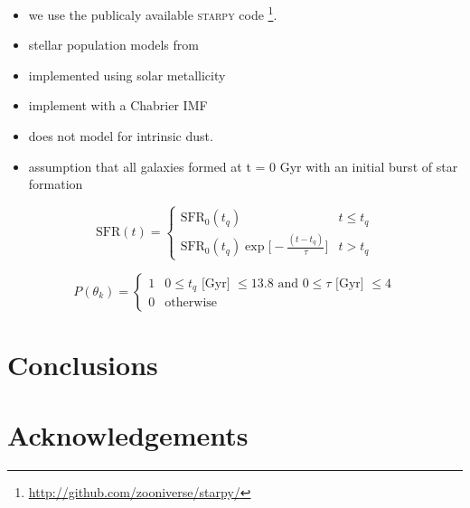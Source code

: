 \documentclass[a4paper,fleqn,usenatbib]{mnras}
\begin{document}
   \begin{itemize}
    
      \item we use the publicaly available \textsc{starpy} code \footnote{\url{http://github.com/zooniverse/starpy/}}.
      \item  stellar population models from \cite{bruzual2003}
  
      \item implemented using solar metallicity

      \item implement with a Chabrier IMF \cite{chabrier2003}

      \item does not model for intrinsic dust.

      \item  assumption that all galaxies formed at t = 0 Gyr with 
             an initial burst of star formation
   \end{itemize}
 
   \begin{equation}
      \text{SFR}(t) = \begin{cases}
                \text{SFR}_{0}(t_{q}) & t \leq t_{q} \\
                \text{SFR}_{0}(t_{q})\exp\bigg[-\frac{(t-t_{q})}{\tau}\bigg] & t > t_{q} 
               \end{cases}
       \label{eq:model}
   \end{equation}



   

   \begin{equation}
      P(\theta_{k}) = \begin{cases}
                       1 & 0\leq t_{q}\text{ [Gyr] } \leq 13.8 \text{ and }  0 \leq \tau\text{ [Gyr] } \leq 4 \\
                       0 & \text{otherwise}
                      \end{cases}
      \label{eq:prior}
   \end{equation}

\section{Conclusions}

\section*{Acknowledgements}










\appendix




\bsp	%
\label{lastpage}
\end{document}
